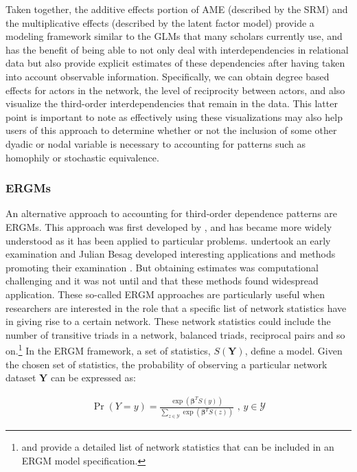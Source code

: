 \documentclass[12pt,onesided,pdflatex]{amsart}
\begin{document}
Taken together, the additive effects portion of AME (described by the SRM) and the multiplicative effects (described by the latent factor model) provide a modeling framework similar to the GLMs that many scholars currently use, and has the benefit of being able to not only deal with interdependencies in relational data but also provide explicit estimates of these dependencies after having taken into account observable information. Specifically, we can obtain degree based effects for actors in the network, the level of reciprocity between actors, and also visualize the third-order interdependencies that remain in the data. This latter point is important to note as effectively using these visualizations may also help users of this approach to determine whether or not the inclusion of some other dyadic or nodal variable is necessary to accounting for patterns such as homophily or stochastic equivalence. 

\subsubsection{\textbf{ERGMs}}

An alternative approach to accounting for third-order dependence patterns are ERGMs. This approach was first developed by \citet{erdos:renyi:1959}, and has became more widely understood as it has been applied to particular problems. \citet{frank:1971} undertook an early examination and Julian Besag developed interesting applications and methods promoting their examination \citep{besag:1977b}. But obtaining estimates was computational challenging and it was not until \citet{frank:strauss:1986} and \citet{wasserman:pattison:1996} that these methods found widespread application. These so-called ERGM approaches are particularly useful when researchers are interested in the role that a specific list of network statistics have in giving rise to a certain network. These network statistics could include the number of transitive triads in a network, balanced triads, reciprocal pairs and so on.\footnote{\citet{morris:etal:2008} and \citet{snijders:etal:2006} provide a detailed list of network statistics that can be included in an ERGM model specification.} In the ERGM framework, a set of statistics, $S(\mathbf{Y})$, define a model. Given the chosen set of statistics, the probability of observing a particular network dataset $\mathbf{Y}$ can be expressed as:

\begin{align}
\Pr(Y = y) = \frac{ \exp( \bm\beta^{T} S(y)  )  }{ \sum_{z \in \mathcal{Y}} \exp( \bm\beta^{T} S(z)  )  } \text{ ,  } y \in \mathcal{Y}
\label{eqn:ergm}
\end{align}
\end{document}
